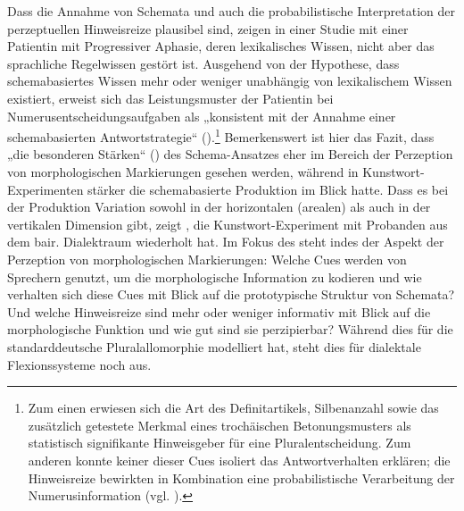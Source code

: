 Dass die Annahme von Schemata und auch die probabilistische Interpretation der perzeptuellen Hinweisreize plausibel sind, zeigen \citet{DomahsEtAl2017} in einer Studie mit einer Patientin mit Progressiver Aphasie, deren lexikalisches Wissen, nicht aber das sprachliche Regelwissen gestört ist. Ausgehend von der Hypothese, dass schemabasiertes Wissen mehr oder weniger unabhängig von lexikalischem Wissen existiert, erweist sich das Leistungsmuster der Patientin bei Numerusentscheidungsaufgaben als „konsistent mit der Annahme einer schemabasierten Antwortstrategie“ (\citealt[227]{DomahsEtAl2017}).\footnote{Zum einen erwiesen sich die Art des Definitartikels, Silbenanzahl sowie das zusätzlich getestete Merkmal eines trochäischen Betonungsmusters als statistisch signifikante Hinweisgeber für eine Pluralentscheidung. Zum anderen konnte keiner dieser Cues isoliert das Antwortverhalten erklären; die Hinweisreize bewirkten in Kombination eine probabilistische Verarbeitung der Numerusinformation (vgl. \citealt[228]{DomahsEtAl2017}).} Bemerkenswert ist hier das Fazit, dass „die besonderen Stärken“ (\citealt[229]{DomahsEtAl2017}) des Schema-Ansatzes eher im Bereich der Perzeption von morphologischen Markierungen gesehen werden, während \citet{Köpcke1988, Köpcke2000b} in Kunstwort-Experimenten stärker die schemabasierte Produktion im Blick hatte. Dass es bei der Produktion Variation sowohl in der horizontalen (arealen) als auch in der vertikalen Dimension gibt, zeigt \citet{Ronneberger-Sibold2021}, die  Kunstwort-Experiment mit Probanden aus dem bair. Dialektraum wiederholt hat. Im Fokus des  steht indes der Aspekt der Perzeption von morphologischen Markierungen: Welche Cues werden von Sprechern genutzt, um die morphologische Information zu kodieren und wie verhalten sich diese Cues mit Blick auf die prototypische Struktur von Schemata? Und welche Hinweisreize sind mehr oder weniger informativ mit Blick auf die morphologische Funktion und wie gut sind sie perzipierbar? Während \citet{Köpcke1993} dies für die standarddeutsche Pluralallomorphie modelliert hat, steht dies für dialektale Flexionssysteme noch aus.
